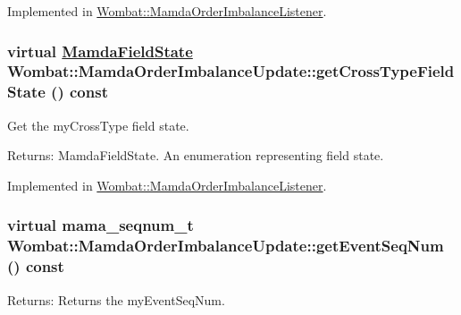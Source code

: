 Implemented in \hyperlink{classWombat_1_1MamdaOrderImbalanceListener_068ff249e302d5490189e747622fae22}{Wombat::Mamda\-Order\-Imbalance\-Listener}.\hypertarget{classWombat_1_1MamdaOrderImbalanceUpdate_4eb6eaad6b33254dd361309e26299e3e}{
\subsubsection[getCrossTypeFieldState]{\setlength{\rightskip}{0pt plus 5cm}virtual \hyperlink{namespaceWombat_93aac974f2ab713554fd12a1fa3b7d2a}{Mamda\-Field\-State} Wombat::Mamda\-Order\-Imbalance\-Update::get\-Cross\-Type\-Field\-State () const}}
\label{classWombat_1_1MamdaOrderImbalanceUpdate_4eb6eaad6b33254dd361309e26299e3e}


Get the my\-Cross\-Type field state. 

\begin{Desc}
\item[Returns:]Mamda\-Field\-State. An enumeration representing field state. \end{Desc}


Implemented in \hyperlink{classWombat_1_1MamdaOrderImbalanceListener_ad35a45f28ab61abc265d15c76a26c37}{Wombat::Mamda\-Order\-Imbalance\-Listener}.\hypertarget{classWombat_1_1MamdaOrderImbalanceUpdate_f0ea246f8936ce1fa502a9972486c1ec}{
\subsubsection[getEventSeqNum]{\setlength{\rightskip}{0pt plus 5cm}virtual mama\_\-seqnum\_\-t Wombat::Mamda\-Order\-Imbalance\-Update::get\-Event\-Seq\-Num () const}}
\label{classWombat_1_1MamdaOrderImbalanceUpdate_f0ea246f8936ce1fa502a9972486c1ec}


\begin{Desc}
\item[Returns:]Returns the my\-Event\-Seq\-Num. \end{Desc}


